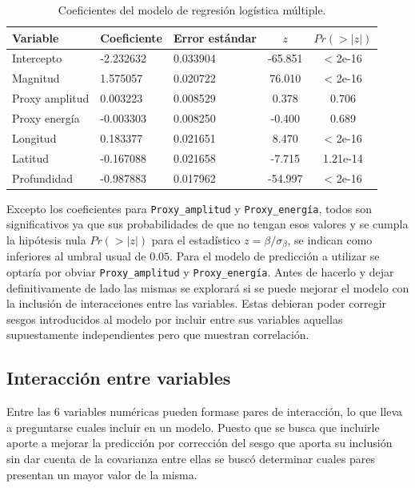 \documentclass[a4paper]{report}
\begin{document}
\begin{table}[!ht]
 	\centering
 	\begin{tabular}{lllcc}
 		\toprule
 		Variable & Coeficiente & Error estándar & \(z\) & \(Pr(>|z|)\) \\
 		\midrule
 		Intercepto & -2.232632 & 0.033904 & -65.851 & < 2e-16 \\
 		Magnitud & 1.575057 & 0.020722 & 76.010 & < 2e-16 \\
 		Proxy amplitud & 0.003223 & 0.008529 & 0.378 & 0.706 \\
 		Proxy energía & -0.003303 & 0.008250 & -0.400 & 0.689 \\
 		Longitud & 0.183377 & 0.021651 & 8.470 & < 2e-16 \\
 		Latitud & -0.167088 & 0.021658 & -7.715 & 1.21e-14 \\
 		Profundidad & -0.987883 & 0.017962 & -54.997 & < 2e-16 \\
 		\bottomrule
 	\end{tabular}
 	\caption{Coeficientes del modelo de regresión logística múltiple.}
 	\label{tab:coeficientes}
\end{table}

Excepto los coeficientes para \lstinline[language = R]'Proxy_amplitud' y  \lstinline[language = R]'Proxy_energía', todos son significativos ya que sus probabilidades de que no tengan esos valores y se cumpla la hipótesis nula \(Pr(>|z|)\) para el estadístico \(z = \beta / \sigma_\beta\), se indican como inferiores al umbral usual de \(0.05\).
Para el modelo de predicción a utilizar se optaría por obviar \lstinline[language = R]'Proxy_amplitud' y  \lstinline[language = R]'Proxy_energía'.
Antes de hacerlo y dejar definitivamente de lado las mismas se explorará si se puede mejorar el modelo con la inclusión de interacciones entre las variables.
Estas debieran poder corregir sesgos introducidos al modelo por incluir entre sus variables aquellas supuestamente independientes pero que muestran correlación.




\subsection{Interacción entre variables}\label{sec:logística_con_interacción}
Entre las 6 variables numéricas pueden formase pares de interacción, lo que lleva a preguntarse cuales incluir en un modelo.
Puesto que se busca que incluirle aporte a mejorar la predicción por corrección del sesgo que aporta su inclusión sin dar cuenta de la covarianza entre ellas se buscó determinar cuales pares presentan un mayor valor de la misma.
\end{document}
